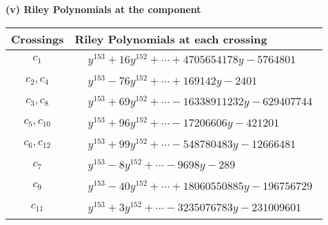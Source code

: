 \documentclass[1p]{elsarticle_modified}
\theoremstyle{definition}
\begin{document}
\newpage\renewcommand{\arraystretch}{1}
\flushleft \textbf{(v) Riley Polynomials at the component}\newline \\
\begin{tabular}{m{50pt}|m{274pt}}
Crossings & \hspace{64pt}Riley Polynomials at each crossing \\
\hline $$\begin{aligned}c_{1}\end{aligned}$$&$\begin{aligned}
&y^{153}+16 y^{152}+\cdots+4705654178 y-5764801
\end{aligned}$\\
\hline $$\begin{aligned}c_{2},c_{4}\end{aligned}$$&$\begin{aligned}
&y^{153}-76 y^{152}+\cdots+169142 y-2401
\end{aligned}$\\
\hline $$\begin{aligned}c_{3},c_{8}\end{aligned}$$&$\begin{aligned}
&y^{153}+69 y^{152}+\cdots-16338911232 y-629407744
\end{aligned}$\\
\hline $$\begin{aligned}c_{5},c_{10}\end{aligned}$$&$\begin{aligned}
&y^{153}+96 y^{152}+\cdots-17206606 y-421201
\end{aligned}$\\
\hline $$\begin{aligned}c_{6},c_{12}\end{aligned}$$&$\begin{aligned}
&y^{153}+99 y^{152}+\cdots-548780483 y-12666481
\end{aligned}$\\
\hline $$\begin{aligned}c_{7}\end{aligned}$$&$\begin{aligned}
&y^{153}-8 y^{152}+\cdots-9698 y-289
\end{aligned}$\\
\hline $$\begin{aligned}c_{9}\end{aligned}$$&$\begin{aligned}
&y^{153}-40 y^{152}+\cdots+18060550885 y-196756729
\end{aligned}$\\
\hline $$\begin{aligned}c_{11}\end{aligned}$$&$\begin{aligned}
&y^{153}+3 y^{152}+\cdots-3235076783 y-231009601
\end{aligned}$\\
\hline
\end{tabular}\\~\\
\end{document}
